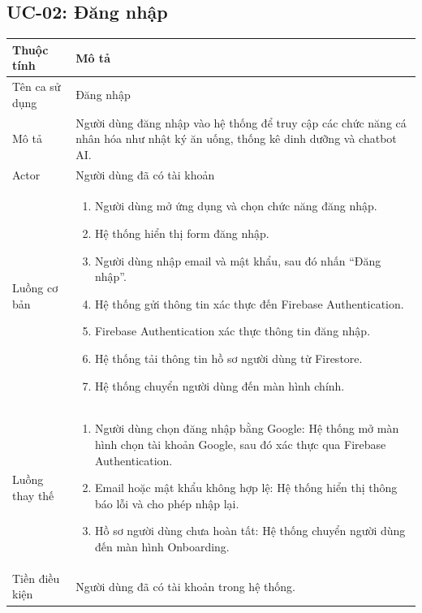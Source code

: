 \subsection{UC-02: Đăng nhập}

\begin{longtable}{|p{4cm}|p{11cm}|}
    \hline
    \textbf{Thuộc tính} & \textbf{Mô tả} \\
    \hline
    \endhead
    \hline
    \endfoot
    Tên ca sử dụng & Đăng nhập \\
    \hline
    Mô tả & Người dùng đăng nhập vào hệ thống để truy cập các chức năng cá nhân hóa như nhật ký ăn uống, thống kê dinh dưỡng và chatbot AI. \\
    \hline
    Actor & Người dùng đã có tài khoản \\
    \hline
    Luồng cơ bản &
        \begin{enumerate}[nosep]
            \item Người dùng mở ứng dụng và chọn chức năng đăng nhập.
            \item Hệ thống hiển thị form đăng nhập.
            \item Người dùng nhập email và mật khẩu, sau đó nhấn ``Đăng nhập''.
            \item Hệ thống gửi thông tin xác thực đến Firebase Authentication.
            \item Firebase Authentication xác thực thông tin đăng nhập.
            \item Hệ thống tải thông tin hồ sơ người dùng từ Firestore.
            \item Hệ thống chuyển người dùng đến màn hình chính.
        \end{enumerate} \\
    \hline
    Luồng thay thế &
        \begin{enumerate}[nosep]
            \item[3a.] Người dùng chọn đăng nhập bằng Google: Hệ thống mở màn hình chọn tài khoản Google, sau đó xác thực qua Firebase Authentication.
            \item[4a.] Email hoặc mật khẩu không hợp lệ: Hệ thống hiển thị thông báo lỗi và cho phép nhập lại.
            \item[6a.] Hồ sơ người dùng chưa hoàn tất: Hệ thống chuyển người dùng đến màn hình Onboarding.
        \end{enumerate} \\
    \hline
    Tiền điều kiện & Người dùng đã có tài khoản trong hệ thống. \\

\end{longtable}
